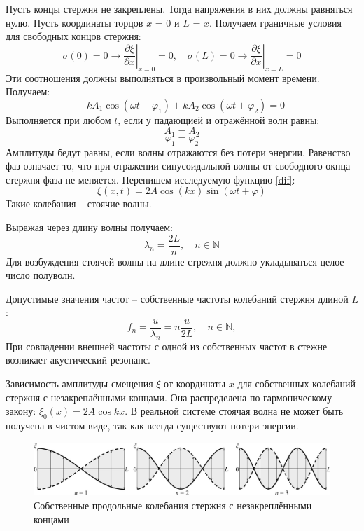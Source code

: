 \documentclass[a4paper,12pt]{article}
\begin{document}
	Пусть концы стержня не закреплены. Тогда напряжения в них должны равняться нулю. Пусть координаты торцов $x$ = 0 и $L$ = $x$. Получаем граничные условия для свободных концов стержня:
	$$
	\sigma(0)=\left.0 \rightarrow \frac{\partial \xi}{\partial x}\right|_{x=0}=0, \quad \sigma(L)=\left.0 \rightarrow \frac{\partial \xi}{\partial x}\right|_{x=L}=0
	$$
	Эти соотношения должны выполняться в произвольный момент времени. Получаем:
	$$
	-k A_{1} \cos \left(\omega t+\varphi_{1}\right)+k A_{2} \cos \left(\omega t+\varphi_{2}\right)=0
	$$
	Выполняется при любом $t$, если у падающией и отражённой волн равны:
	$$
	A_{1}=A_{2}
	$$
	$$
	\varphi_{1}=\varphi_{2}
	$$
	Амплитуды бедут равны, если волны отражаются без потери энергии. Равенство фаз означает то, что при отражении синусоидальной волны от свободного окнца стержня фаза не меняется. Перепишем исследуемую функцию \ref{dif}:
	$$
	\xi(x, t)=2 A \cos (k x) \sin (\omega t+\varphi)
	$$
	Такие колебания -- стоячие волны. 

	Выражая через длину волны получаем:
	$$
	\lambda_{n}=\frac{2 L}{n}, \quad n \in \mathbb{N}
	$$
	Для возбуждения стоячей волны на длине стрежня должно укладываться целое число полуволн.
	
	Допустимые значения частот -- собственные частоты колебаний стержня длиной $L$:
	$$
	f_{n}=\frac{u}{\lambda_{n}}=n \frac{u}{2 L}, \quad n \in \mathbb{N},
	$$
	При совпадении внешней частоты с одной из собственных частот в стежне возникает акустический резонанс.
	
	Зависимость амплитуды смещения $\xi$ от координаты $x$ для собственных колебаний стержня с незакреплёнными концами. Она распределена по гармоническому закону: $\xi_{0}(x)=2 A \cos k x$. В реальной системе стоячая волна не может	быть получена в чистом виде, так как всегда существуют потери энергии.
	
	\begin{figure}[h!] 
		\centering
		\includegraphics[scale=0.33]{2}
		\caption{Собственные продольные колебания стержня с незакреплёнными концами}
		\label{pic2}
	\end{figure}
	
\end{document}
